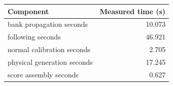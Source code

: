 \begin{tabular}{lr}
\toprule
Component & Measured time (s) \\
\midrule
bank propagation seconds & 10.073 \\
following seconds & 46.921 \\
normal calibration seconds & 2.705 \\
physical generation seconds & 17.245 \\
score assembly seconds & 0.627 \\
\bottomrule
\end{tabular}
